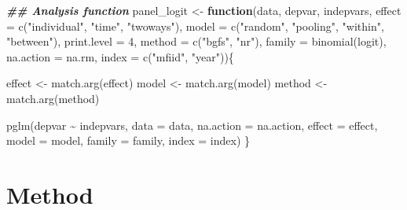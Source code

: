 \documentclass[a4paper,nobind]{templates/ociamthesis}
\newenvironment{Shaded}{\begin{snugshade}}{\end{snugshade}}
\newcommand{\AttributeTok}[1]{\textcolor[rgb]{0.77,0.63,0.00}{#1}}
\newcommand{\ControlFlowTok}[1]{\textcolor[rgb]{0.13,0.29,0.53}{\textbf{#1}}}
\newcommand{\DecValTok}[1]{\textcolor[rgb]{0.00,0.00,0.81}{#1}}
\newcommand{\DocumentationTok}[1]{\textcolor[rgb]{0.56,0.35,0.01}{\textbf{\textit{#1}}}}
\newcommand{\FunctionTok}[1]{\textcolor[rgb]{0.00,0.00,0.00}{#1}}
\newcommand{\NormalTok}[1]{#1}
\newcommand{\OtherTok}[1]{\textcolor[rgb]{0.56,0.35,0.01}{#1}}
\newcommand{\SpecialCharTok}[1]{\textcolor[rgb]{0.00,0.00,0.00}{#1}}
\newcommand{\StringTok}[1]{\textcolor[rgb]{0.31,0.60,0.02}{#1}}
\renewenvironment{Shaded}
{
  \vspace{10pt}%
  \begin{snugshade}%
}{%
  \end{snugshade}%
  \vspace{8pt}%
}
\begin{document}
\begin{Shaded}
\begin{Highlighting}[]
\DocumentationTok{\#\# Analysis function}
\NormalTok{panel\_logit }\OtherTok{\textless{}{-}} \ControlFlowTok{function}\NormalTok{(data, depvar, indepvars,}
                        \AttributeTok{effect =} \FunctionTok{c}\NormalTok{(}\StringTok{"individual"}\NormalTok{, }\StringTok{"time"}\NormalTok{, }\StringTok{"twoways"}\NormalTok{),}
                        \AttributeTok{model =} \FunctionTok{c}\NormalTok{(}\StringTok{"random"}\NormalTok{, }\StringTok{"pooling"}\NormalTok{, }\StringTok{"within"}\NormalTok{, }\StringTok{"between"}\NormalTok{),}
                        \AttributeTok{print.level =} \DecValTok{4}\NormalTok{,}
                        \AttributeTok{method =} \FunctionTok{c}\NormalTok{(}\StringTok{"bgfs"}\NormalTok{, }\StringTok{"nr"}\NormalTok{),}
                        \AttributeTok{family =} \FunctionTok{binomial}\NormalTok{(}\StringTok{\textquotesingle{}logit\textquotesingle{}}\NormalTok{),}
                        \AttributeTok{na.action =}\NormalTok{ na.rm, }
                        \AttributeTok{index =} \FunctionTok{c}\NormalTok{(}\StringTok{"mfiid"}\NormalTok{, }\StringTok{"year"}\NormalTok{))\{}
 
\NormalTok{   effect }\OtherTok{\textless{}{-}} \FunctionTok{match.arg}\NormalTok{(effect)}
\NormalTok{   model }\OtherTok{\textless{}{-}} \FunctionTok{match.arg}\NormalTok{(model)}
\NormalTok{   method }\OtherTok{\textless{}{-}} \FunctionTok{match.arg}\NormalTok{(method)}
   
  \FunctionTok{pglm}\NormalTok{(depvar }\SpecialCharTok{\textasciitilde{}}\NormalTok{ indepvars, }
       \AttributeTok{data =}\NormalTok{ data, }
       \AttributeTok{na.action =}\NormalTok{ na.action, }
       \AttributeTok{effect =}\NormalTok{ effect,}
       \AttributeTok{model =}\NormalTok{ model, }
       \AttributeTok{family =}\NormalTok{ family, }
       \AttributeTok{index =}\NormalTok{ index)}
\NormalTok{\}}
\end{Highlighting}
\end{Shaded}

\hypertarget{method}{%
\chapter{Method}\label{method}}
\end{document}
